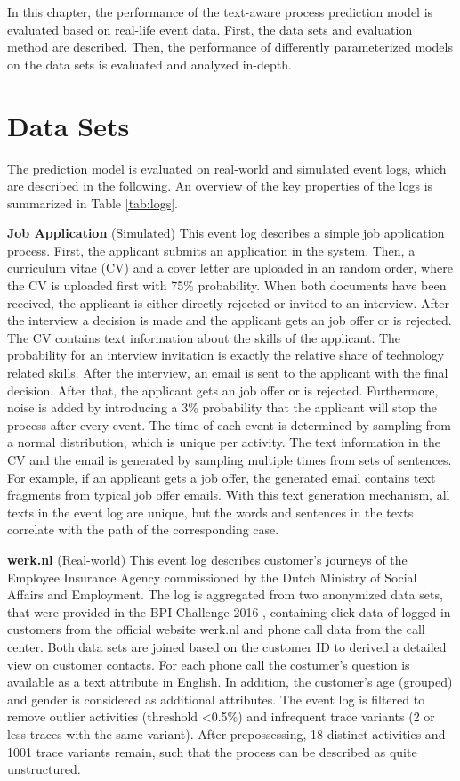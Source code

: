 In this chapter, the performance of the text-aware process prediction model is evaluated based on real-life event data.
First, the data sets and evaluation method are described. Then, the performance of differently parameterized models on the data sets is evaluated and analyzed in-depth.


\section{Data Sets}

The prediction model is evaluated on real-world and simulated event logs, which are described in the following. An overview of the key properties of the logs is summarized in Table \ref{tab:logs}.

\textbf{Job Application} (Simulated) This event log describes a simple job application process. 
First, the applicant submits an application in the system.
Then, a curriculum vitae (CV) and a cover letter are uploaded in an random order, where the CV is uploaded first with 75\% probability.
When both documents have been received, the applicant is either directly rejected or invited to an interview.
After the interview a decision is made and the applicant gets an job offer or is rejected.
The CV contains text information about the skills of the applicant.
The probability for an interview invitation is exactly the relative share of technology related skills.
After the interview, an email is sent to the applicant with the final decision.
After that, the applicant gets an job offer or is rejected.
Furthermore, noise is added by introducing a 3\% probability that the applicant will stop the process after every event.
The time of each event is determined by sampling from a normal distribution, which is unique per activity.
The text information in the CV and the email is generated by sampling multiple times from sets of sentences.
For example, if an applicant gets a job offer, the generated email contains text fragments from typical job offer emails.
With this text generation mechanism, all texts in the event log are unique, but the words and sentences in the texts correlate with the path of the corresponding case.

\textbf{werk.nl} (Real-world) This event log describes customer's journeys of the Employee Insurance Agency commissioned by the Dutch Ministry of Social Affairs and Employment. The log is aggregated from two anonymized data sets, that were provided in the BPI Challenge 2016 \cite{bpichallenge2016}, containing click data of logged in customers from the official website werk.nl and phone call data from the call center.
Both data sets are joined based on the customer ID to derived a detailed view on customer contacts.
For each phone call the costumer's question is available as a text attribute in English. In addition, the customer's age (grouped) and gender is considered as additional attributes.
The event log is filtered to remove outlier activities (threshold <0.5\%) and infrequent trace variants (2 or less traces with the same variant). After prepossessing, 18 distinct activities and 1001 trace variants remain, such that the process can be described as quite unstructured.

